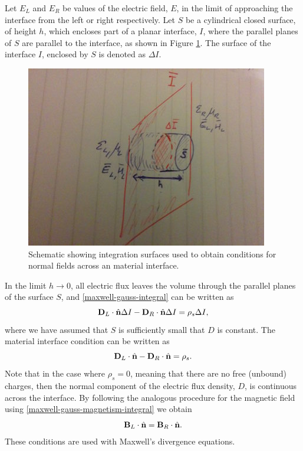 Let $E_L$ and $E_R$ be values of the electric field, $E$, in the limit of approaching the interface from the left or right respectively. Let $S$ be a cylindrical closed surface, of height $h$, which encloses part of a planar interface, $I$, where the parallel planes of $S$ are parallel to the interface, as shown in Figure \ref{fig:material-interface-derivation:E-pillbox}. The surface of the interface $I$, enclosed by $S$ is denoted as $\Delta I$.
\begin{figure}[htbp!]
\begin{center}
    \includegraphics[scale=0.9]{Figures/Chapters/PhysicalProblem/interfaceEPillBox}
\end{center}
\caption{Schematic showing integration surfaces used to obtain conditions for normal fields across an material interface.}
\label{fig:material-interface-derivation:E-pillbox}
\end{figure}
In the limit $h \to 0$, all electric flux leaves the volume through the parallel planes of the surface $S$, and \eqref{maxwell-gauss-integral} can be written as
$$
\mathbf{D}_L \cdot \hat{\mathbf{n}} \Delta I  - \mathbf{D}_R \cdot \hat{\mathbf{n}} \Delta I = \rho_s \Delta I,
$$
where we have assumed that $S$ is sufficiently small that $D$ is constant. The material interface condition can be written as
$$
\mathbf{D}_L \cdot \hat{\mathbf{n}} - \mathbf{D}_R \cdot \hat{\mathbf{n}} = \rho_s .
$$
Note that in the case where $\rho_s = 0$, meaning that there are no free (unbound) charges, then the normal component of the electric flux density, $D$, is continuous across the interface.
By following the analogous procedure for the magnetic field using \eqref{maxwell-gauss-magnetism-integral} we obtain
$$
\mathbf{B}_L \cdot \hat{\mathbf{n}} = \mathbf{B}_R \cdot \hat{\mathbf{n}} .
$$
These conditions are used with Maxwell's divergence equations.

